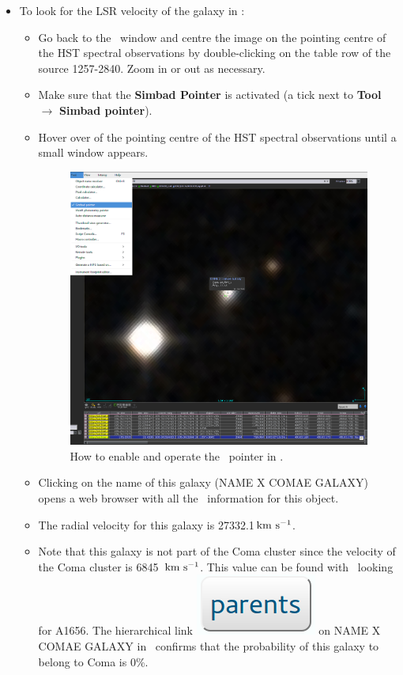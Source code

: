 \documentclass [a4paper, 12pt]{article}
\begin{document}
\begin{itemize}
\item To look for the LSR velocity of the galaxy in \simbad:
\begin{itemize}
\item Go back to the \aladin\ window and centre the image on the pointing
centre of the HST spectral observations by double-clicking on the table row of
the source 1257-2840. Zoom in or out as necessary.
\item Make sure that the \textbf{Simbad Pointer} is activated (a tick next to
\textbf{Tool} $\rightarrow$ \textbf{Simbad pointer}).
\item Hover over of the pointing centre of the HST spectral observations until
a small window appears.
\begin{figure}[H]
\center
\includegraphics[width=0.5
\textwidth]{../images/aladin_simbad_pointer-coma.png}
\caption{How to enable and operate the \simbad\ pointer in \aladin.}
\label{fig:slit}
\end{figure}
\item Clicking on the name of this galaxy (NAME X COMAE GALAXY) opens a web
browser with all the \simbad\ information for this object.
\item The radial velocity for this galaxy is 27332.1\,$\rm km\ s^{-1}$.
\item Note that this galaxy is not part of the Coma cluster since the velocity
of the Coma cluster is 6845~$\rm km\ s^{-1}$. This value can be found with \simbad\
looking for A1656. The hierarchical link \includegraphics[width=0.07
\textwidth]{../images/simbad_button_parents.png} on NAME X COMAE GALAXY in
\simbad\ confirms that the probability of this galaxy to belong to Coma is 0\%.
\end{itemize}


\end{itemize}
\end{document}
